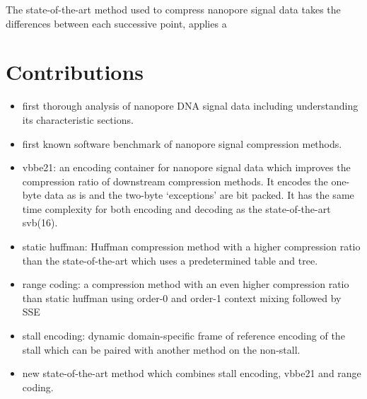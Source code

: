 The state-of-the-art method used to compress nanopore signal data takes the
differences between each successive point, applies a 





\section{Contributions}
\begin{itemize}
\item first thorough analysis of nanopore DNA signal data including
	understanding its characteristic sections.
\item first known software benchmark of nanopore signal compression methods.
\item vbbe21: an encoding container for nanopore signal data which improves the
	compression ratio of downstream compression methods.
It encodes the one-byte data as is and the two-byte `exceptions' are bit packed.
It has the same time complexity for both encoding and decoding as the
state-of-the-art svb(16).
\item static huffman: Huffman compression method with a higher compression ratio than
	the state-of-the-art which uses a predetermined table and tree.
\item range coding: a compression method with an even higher compression ratio
	than static huffman using order-0 and order-1 context mixing followed by
	SSE
\item stall encoding: dynamic domain-specific frame of reference encoding of the
	stall which can be paired with another method on the non-stall.
\item new state-of-the-art method which combines stall encoding, vbbe21 and
	range coding.
\end{itemize}

